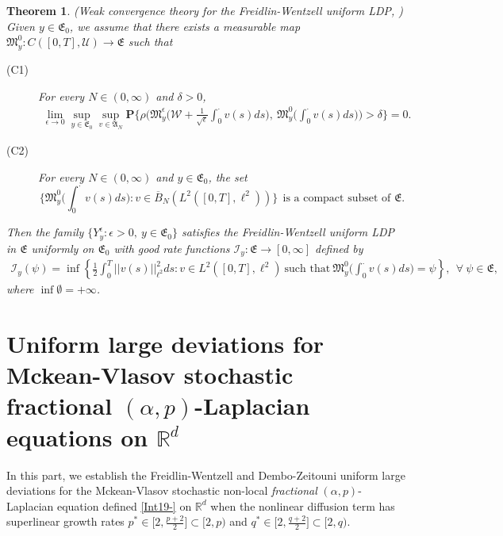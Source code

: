 \documentclass[11pt]{article}
\newtheorem{theorem}{Theorem}[section]
\numberwithin{equation}{section}
\begin{document}
\begin{theorem}\label{Tattractor1}
(Weak convergence theory for the Freidlin-Wentzell uniform LDP, \cite[Theorem 2.13]{Salins2}) Given $y\in\mathfrak{E}_0$, we assume that there exists a measurable map
$\mathfrak{M}_y^0: C([0,T],\mathcal{U})\rightarrow\mathfrak{E}$
 such that
\begin{description}
  \item[(C1)] For every $N\in(0,\infty)$ and $\delta>0$,
\begin{align*}
\lim_{\epsilon\rightarrow0}
\sup_{y\in\mathfrak{E}_0}\sup_{v\in\mathfrak{A}_N}
\mathbf{P}\Bigg\{ \rho\Bigg( \mathfrak{M}_y^\epsilon\bigg(\mathcal{W}+
\frac{1}{\sqrt{\epsilon}}\int_0^{\cdot}v(s)ds\bigg)  , \ \mathfrak{M}_y^0
\bigg(
\int_0^{\cdot}v(s)ds\bigg)\Bigg)>\delta
\Bigg\}=0.
\end{align*}
\item[(C2)] For every $N\in(0,\infty)$ and $y\in\mathfrak{E}_0$, the set $$\Bigg\{\mathfrak{M}_y^0
\bigg(
\int_0^{\cdot}v(s)ds\bigg):v\in \overline{B}_N(L^2([0,T],\ell^2 ))\Bigg\}\ \ \mbox{is a compact subset of $\mathfrak{E}$}.$$
\end{description}
Then the family $\{Y^\epsilon_y: \epsilon>0,\ y\in\mathfrak{E}_0\}$ satisfies the Freidlin-Wentzell uniform LDP in $\mathfrak{E}$ uniformly on $\mathfrak{E}_0$ with good rate functions $\mathcal{I}_y:\mathfrak{E}
\rightarrow[0,\infty]$ defined by
\begin{align*}
\mathcal{I}_y(\psi)=\inf\left\{\frac{1}{2}
\int_{0}^{T}||v(s)||_{\ell^{2}}^{2}ds:
v\in L^{2}([0,T],\ell^{2})~
\text{such~that}~\mathfrak{M}_y^0
\bigg(
\int_0^{\cdot}v(s)ds\bigg)=\psi\right\},\ \ \forall\ \psi\in\mathfrak{E},
\end{align*}
where $\inf\emptyset=+\infty$.
\end{theorem}





\section{Uniform large deviations for Mckean-Vlasov
stochastic fractional $(\alpha,p)$-Laplacian equations on $\mathbb{R}^d$}

In this part, we establish the
Freidlin-Wentzell and Dembo-Zeitouni uniform large deviations
 for the Mckean-Vlasov
stochastic non-local \emph{fractional} $(\alpha,p)$-Laplacian equation
defined \eqref{Int19-} on $\mathbb{R}^d$ when the nonlinear diffusion term has superlinear
growth rates $p^*\in\big[2,\frac{p+2}{2}\big]\subset[2,p)$ and $q^*\in\big[2,\frac{q+2}{2}\big]\subset[2,q)$.
\end{document}
